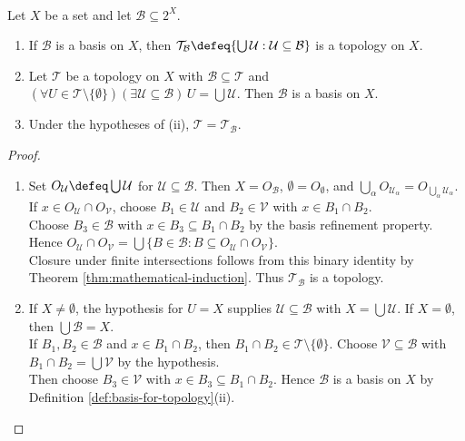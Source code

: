 \begin{proposition} \label{prop:basis-generated-topology-characterization} \\
Let $X$ be a set and let $\mathcal{B}\subseteq 2^X$.
\begin{enumerate}[label=(\roman*)]
\setlength{\itemsep}{0pt}
\item If $\mathcal{B}$ is a basis on $X$, then $\mathcal{T}_{\mathcal{B}}\defeq\{\bigcup\mathcal{U}:\mathcal{U}\subseteq\mathcal{B}\}$ is a topology on $X$.
\item Let $\mathcal{T}$ be a topology on $X$ with $\mathcal{B}\subseteq\mathcal{T}$ and $(\forall U\in\mathcal{T}\setminus\{\emptyset\})(\exists\mathcal{U}\subseteq\mathcal{B})\,U=\bigcup\mathcal{U}$. Then $\mathcal{B}$ is a basis on $X$.
\item Under the hypotheses of (ii), $\mathcal{T}=\mathcal{T}_{\mathcal{B}}$.
\end{enumerate}
\begin{proof}
\begin{enumerate}[label=(\roman*)]
\setlength{\itemsep}{0pt}
\item Set $O_{\mathcal{U}}\defeq\bigcup\mathcal{U}$ for $\mathcal{U}\subseteq\mathcal{B}$. Then $X=O_{\mathcal{B}}$, $\emptyset=O_{\emptyset}$, and $\bigcup\limits_{\alpha}O_{\mathcal{U}_\alpha}=O_{\bigcup\limits_{\alpha}\mathcal{U}_\alpha}$.\\
If $x\in O_{\mathcal{U}}\cap O_{\mathcal{V}}$, choose $B_1\in\mathcal{U}$ and $B_2\in\mathcal{V}$ with $x\in B_1\cap B_2$.\\
Choose $B_3\in\mathcal{B}$ with $x\in B_3\subseteq B_1\cap B_2$ by the basis refinement property. Hence $O_{\mathcal{U}}\cap O_{\mathcal{V}}=\bigcup\{B\in\mathcal{B}:B\subseteq O_{\mathcal{U}}\cap O_{\mathcal{V}}\}$.\\
Closure under finite intersections follows from this binary identity by Theorem \ref{thm:mathematical-induction}. Thus $\mathcal{T}_{\mathcal{B}}$ is a topology.
\item If $X\neq\emptyset$, the hypothesis for $U=X$ supplies $\mathcal{U}\subseteq\mathcal{B}$ with $X=\bigcup\mathcal{U}$. If $X=\emptyset$, then $\bigcup\mathcal{B}=X$.\\
If $B_1,B_2\in\mathcal{B}$ and $x\in B_1\cap B_2$, then $B_1\cap B_2\in\mathcal{T}\setminus\{\emptyset\}$. Choose $\mathcal{V}\subseteq\mathcal{B}$ with $B_1\cap B_2=\bigcup\mathcal{V}$ by the hypothesis.\\
Then choose $B_3\in\mathcal{V}$ with $x\in B_3\subseteq B_1\cap B_2$. Hence $\mathcal{B}$ is a basis on $X$ by Definition \ref{def:basis-for-topology}(ii).

\end{enumerate}
\end{proof}
\end{proposition}
